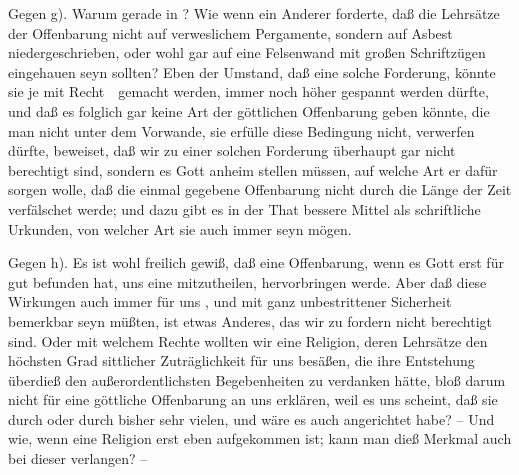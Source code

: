 \begin{aufza}
\begin{aufzb}
\item[Gegen g).] Warum gerade in ? Wie wenn ein Anderer forderte, daß die Lehrsätze der Offenbarung nicht auf verweslichem Pergamente, sondern auf Asbest niedergeschrieben, oder wohl gar auf eine Felsenwand mit großen Schriftzügen eingehauen seyn sollten? Eben der Umstand, daß eine solche Forderung, könnte sie je mit Recht~\ gemacht werden, immer noch höher gespannt werden dürfte, und daß es folglich gar keine Art der göttlichen Offenbarung geben könnte, die man nicht unter dem Vorwande, sie erfülle diese Bedingung nicht, verwerfen dürfte, beweiset, daß wir zu einer solchen Forderung überhaupt gar nicht berechtigt sind, sondern es Gott anheim stellen müssen, auf welche Art er dafür sorgen wolle, daß die einmal gegebene Offenbarung nicht durch die Länge der Zeit verfälschet werde; und dazu gibt es in der That bessere Mittel als schriftliche Urkunden, von welcher Art sie auch immer seyn mögen.
\item[Gegen h).] Es ist wohl freilich gewiß, daß eine Offenbarung, wenn es Gott erst für gut befunden hat, uns eine mitzutheilen,  hervorbringen werde. Aber daß diese Wirkungen auch immer für uns , und mit ganz unbestrittener Sicherheit bemerkbar seyn müßten, ist etwas Anderes, das wir zu fordern nicht berechtigt sind. Oder mit welchem Rechte wollten wir eine Religion, deren Lehrsätze den höchsten Grad sittlicher Zuträglichkeit für uns besäßen, die ihre Entstehung überdieß den außerordentlichsten Begebenheiten zu verdanken hätte, bloß darum nicht für eine göttliche Offenbarung an uns erklären, weil es uns scheint, daß sie durch  oder durch  bisher sehr vielen, und wäre es auch  angerichtet habe? -- Und wie, wenn eine Religion erst eben aufgekommen ist; kann man dieß Merkmal auch bei dieser verlangen? -- 
\end{aufzb}

\end{aufza}
